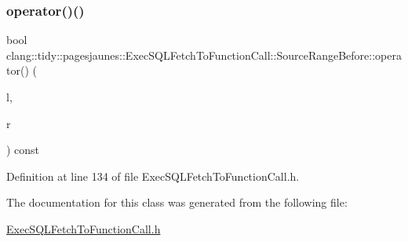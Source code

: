 \subsubsection{\texorpdfstring{operator()()}{operator()()}}
{\footnotesize\ttfamily bool clang\+::tidy\+::pagesjaunes\+::\+Exec\+S\+Q\+L\+Fetch\+To\+Function\+Call\+::\+Source\+Range\+Before\+::operator() (\begin{DoxyParamCaption}\item[{const \hyperlink{classclang_1_1tidy_1_1pagesjaunes_1_1_exec_s_q_l_fetch_to_function_call_1_1_source_range_for_string_literals}{Source\+Range\+For\+String\+Literals} \&}]{l,  }\item[{const \hyperlink{classclang_1_1tidy_1_1pagesjaunes_1_1_exec_s_q_l_fetch_to_function_call_1_1_source_range_for_string_literals}{Source\+Range\+For\+String\+Literals} \&}]{r }\end{DoxyParamCaption}) const\hspace{0.3cm}{\ttfamily [inline]}}



Definition at line 134 of file Exec\+S\+Q\+L\+Fetch\+To\+Function\+Call.\+h.



The documentation for this class was generated from the following file\+:\begin{DoxyCompactItemize}
\item 
\hyperlink{_exec_s_q_l_fetch_to_function_call_8h}{Exec\+S\+Q\+L\+Fetch\+To\+Function\+Call.\+h}\end{DoxyCompactItemize}
